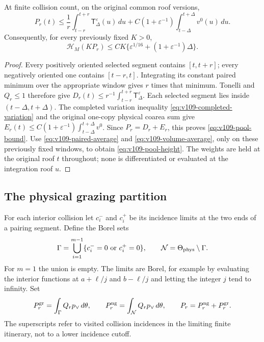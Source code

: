 \begin{theorem}
\label{thm:v109-pool}
At finite collision count, on the original common roof versions,
\begin{equation}\label{eq:v109-pool-bound}
 P_r(t)\leq\frac1r\int_{t-r}^{t+r}\mathsf T_\Delta^\varepsilon(u)\,du
 +C(1+\varepsilon^{-1})\int_{t-\Delta}^{t+\Delta}v^0(u)\,du.
\end{equation}
Consequently, for every previously fixed $K>0$,
\begin{equation}\label{eq:v109-pool-height}
 \mathcal H_M(KP_r)\leq
 CK\{\varepsilon^{1/16}+(1+\varepsilon^{-1})\Delta\}.
\end{equation}
\end{theorem}
\begin{proof}
Every positively oriented selected segment contains $[t,t+r]$;
every negatively oriented one contains $[t-r,t]$. Integrating its
constant paired minimum over the appropriate window gives $r$ times
that minimum. Tonelli and $Q_r\leq1$ therefore give
$D_r(t)\leq r^{-1}\int_{t-r}^{t+r}\mathsf T_\Delta^\varepsilon$.
Each selected segment lies inside $(t-\Delta,t+\Delta)$.
The completed variation inequality \eqref{eq:v109-completed-variation}
and the original one-copy physical coarea sum give
$E_r(t)\leq C(1+\varepsilon^{-1})\int_{t-\Delta}^{t+\Delta}v^0$.
Since $P_r=D_r+E_r$, this proves \eqref{eq:v109-pool-bound}.
Use \eqref{eq:v109-paired-average} and
\eqref{eq:v109-volume-average}, only on these previously fixed
windows, to obtain \eqref{eq:v109-pool-height}.
The weights are held at the original roof $t$ throughout; none is
differentiated or evaluated at the integration roof $u$.
\end{proof}

\subsection{The physical grazing partition}
For each interior collision let $c_i^-$ and $c_i^+$ be its incidence
limits at the two ends of a pairing segment. Define the Borel sets
\begin{equation}\label{eq:v109-grazing-classes}
 \Gamma=\bigcup_{i=1}^{m-1}\{c_i^-=0\ \hbox{or}\ c_i^+=0\},
 \qquad\mathcal N=\Theta_{\rm phys}\setminus\Gamma.
\end{equation}
For $m=1$ the union is empty. The limits are Borel, for example by
evaluating the interior functions at $a+\ell/j$ and $b-\ell/j$ and
letting the integer $j$ tend to infinity. Set
\[
 P_r^{\rm gr}=\int_\Gamma Q_rp_\vee\,d\theta,
 \qquad P_r^{\rm ng}=\int_\mathcal N Q_rp_\vee\,d\theta,
 \qquad P_r=P_r^{\rm ng}+P_r^{\rm gr}.
\]
The superscripts refer to visited collision incidences in the
limiting finite itinerary, not to a lower incidence cutoff.

